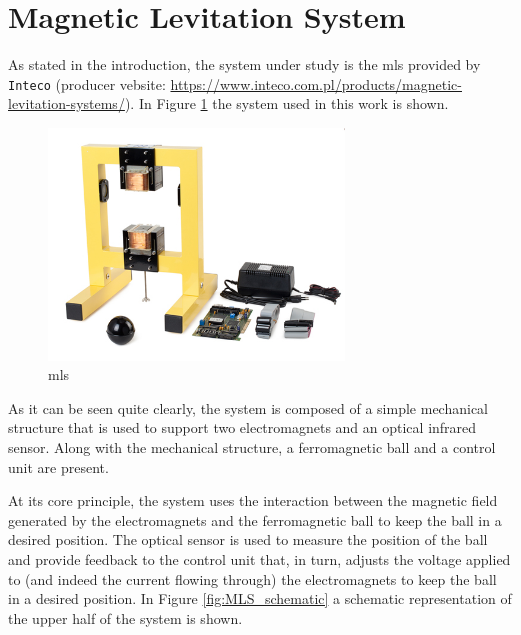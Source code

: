 \section{Magnetic Levitation System}
\label{sec:magnetic_levitation_system}

As stated in the introduction, the system under study is the \acrfull{mls} provided by \texttt{Inteco} (producer vebsite: \url{https://www.inteco.com.pl/products/magnetic-levitation-systems/}).
In Figure \ref{fig:MLS} the system used in this work is shown.

\begin{figure}[H]
    \centering
    \includegraphics[width=0.7\textwidth]{./img/maglev_picture.jpg}
    \caption{\acrlong{mls}}
    \label{fig:MLS}
\end{figure}

As it can be seen quite clearly, the system is composed of a simple mechanical structure that is used to support two electromagnets and an optical infrared sensor.
Along with the mechanical structure, a ferromagnetic ball and a control unit are present.

At its core principle, the system uses the interaction between the magnetic field generated by the electromagnets and the ferromagnetic ball to keep the ball in a desired position.
The optical sensor is used to measure the position of the ball and provide feedback to the control unit that, in turn, adjusts the voltage applied to (and indeed the current flowing through) the electromagnets to keep the ball in a desired position.
In Figure \ref{fig:MLS_schematic} a schematic representation of the upper half of the system is shown.

